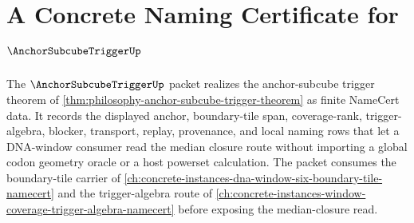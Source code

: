 \chapter{A Concrete Naming Certificate for $\AnchorSubcubeTriggerUp$}
\label{ch:concrete-instances-anchor-subcube-trigger-namecert}

The $\AnchorSubcubeTriggerUp$ packet realizes the anchor-subcube trigger theorem of \autoref{thm:philosophy-anchor-subcube-trigger-theorem} as finite NameCert data. It records the displayed anchor, boundary-tile span, coverage-rank, trigger-algebra, blocker, transport, replay, provenance, and local naming rows that let a DNA-window consumer read the median closure route without importing a global codon geometry oracle or a host powerset calculation. The packet consumes the boundary-tile carrier of \autoref{ch:concrete-instances-dna-window-six-boundary-tile-namecert} and the trigger-algebra route of \autoref{ch:concrete-instances-window-coverage-trigger-algebra-namecert} before exposing the median-closure read.

